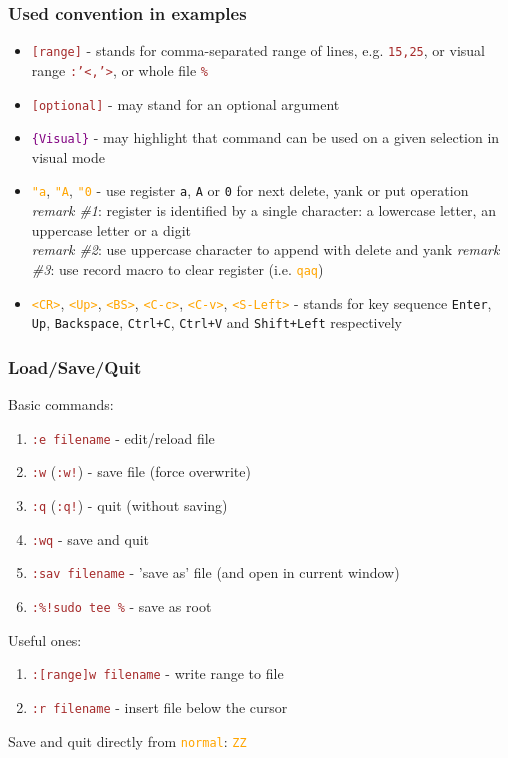 \documentclass{beamer}
\newcommand{\vimnormal}[1]{\texttt{\textcolor{orange}{#1}}}
\newcommand{\vimcommand}[1]{\texttt{\textcolor{brown}{#1}}}
\newcommand{\vimvisual}[1]{\texttt{\textcolor{purple}{#1}}}
\newcommand{\vimkey}[1]{\textless{}#1\textgreater{}}
\begin{document}
\begin{frame}[fragile]
    \frametitle{Used convention in examples}
    {\footnotesize
    \begin{itemize}
        \item \vimcommand{[range]} - stands for comma-separated range of lines, e.g. \vimcommand{15,25}, or visual range \vimcommand{:'\textless{},'\textgreater{}}, or whole file \vimcommand{\%}
        \item \vimcommand{[optional]} - may stand for an optional argument
        \item \vimvisual{\{Visual\}} - may highlight that command can be used on a given selection in visual mode
        \item \vimnormal{"a}, \vimnormal{"A}, \vimnormal{"0} - use register \texttt{a}, \texttt{A} or \texttt{0} for next delete, yank or put operation\\
          \textit{remark \#1}: register is identified by a single character: a lowercase letter, an uppercase letter or a digit\\
          \textit{remark \#2}: use uppercase character to append with delete and yank
          \textit{remark \#3}: use record macro to clear register (i.e. \vimnormal{qaq})
        \item \vimnormal{\vimkey{CR}}, \vimnormal{\vimkey{Up}}, \vimnormal{\vimkey{BS}}, \vimnormal{\vimkey{C-c}}, \vimnormal{\vimkey{C-v}}, \vimnormal{\vimkey{S-Left}} - stands for key sequence \texttt{Enter}, \texttt{Up}, \texttt{Backspace}, \texttt{Ctrl+C}, \texttt{Ctrl+V} and \texttt{Shift+Left} respectively
    \end{itemize}
    }
\end{frame}

\begin{frame}
    \frametitle{Load/Save/Quit}
    Basic commands:
    \begin{enumerate}
        \item \vimcommand{:e filename} - edit/reload file
        \item \vimcommand{:w} (\vimcommand{:w!}) - save file (force overwrite)
        \item \vimcommand{:q} (\vimcommand{:q!}) - quit (without saving)
        \item \vimcommand{:wq} - save and quit
        \item \vimcommand{:sav filename} - 'save as' file (and open in current window)
        \item \vimcommand{:\%!sudo tee \%} - save as root
    \end{enumerate}
    Useful ones:
    \begin{enumerate}
        \item \vimcommand{:[range]w filename} - write range to file
        \item \vimcommand{:r filename} - insert file below the cursor
    \end{enumerate}
    Save and quit directly from \vimnormal{normal}: \vimnormal{ZZ}
\end{frame}
\end{document}
